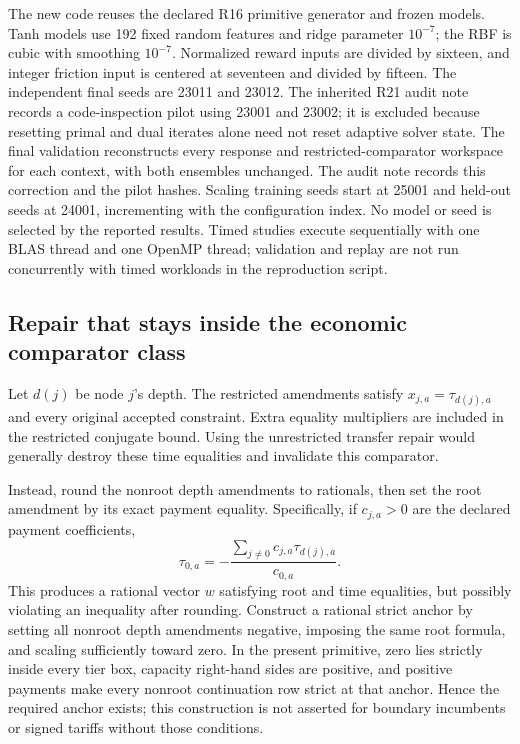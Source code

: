 \documentclass[11pt,letterpaper]{article}
\theoremstyle{definition}
\newcommand{\1}{\mathbf 1}
\begin{document}
The new code reuses the declared R16 primitive generator and frozen models. Tanh models use 192 fixed random features and ridge parameter $10^{-7}$; the RBF is cubic with smoothing $10^{-7}$. Normalized reward inputs are divided by sixteen, and integer friction input is centered at seventeen and divided by fifteen. The independent final seeds are 23011 and 23012. The inherited R21 audit note records a code-inspection pilot using 23001 and 23002; it is excluded because resetting primal and dual iterates alone need not reset adaptive solver state. The final validation reconstructs every response and restricted-comparator workspace for each context, with both ensembles unchanged. The audit note records this correction and the pilot hashes. Scaling training seeds start at 25001 and held-out seeds at 24001, incrementing with the configuration index. No model or seed is selected by the reported results. Timed studies execute sequentially with one BLAS thread and one OpenMP thread; validation and replay are not run concurrently with timed workloads in the reproduction script.

\subsection{Repair that stays inside the economic comparator class}
Let $d(j)$ be node $j$'s depth. The restricted amendments satisfy $x_{j,a}=\tau_{d(j),a}$ and every original accepted constraint. Extra equality multipliers are included in the restricted conjugate bound. Using the unrestricted transfer repair would generally destroy these time equalities and invalidate this comparator.

Instead, round the nonroot depth amendments to rationals, then set the root amendment by its exact payment equality. Specifically, if $c_{j,a}>0$ are the declared payment coefficients,
\[
 \tau_{0,a}=-\frac{\sum_{j\ne0}c_{j,a}\tau_{d(j),a}}{c_{0,a}}.
\]
This produces a rational vector $w$ satisfying root and time equalities, but possibly violating an inequality after rounding. Construct a rational strict anchor by setting all nonroot depth amendments negative, imposing the same root formula, and scaling sufficiently toward zero. In the present primitive, zero lies strictly inside every tier box, capacity right-hand sides are positive, and positive payments make every nonroot continuation row strict at that anchor. Hence the required anchor exists; this construction is not asserted for boundary incumbents or signed tariffs without those conditions.
\end{document}

